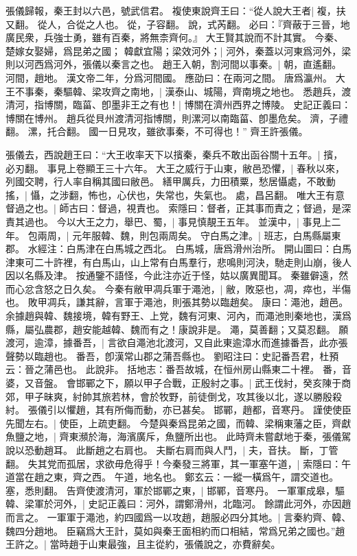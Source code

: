 張儀歸報，秦王封以六邑，號武信君。
複使東說齊王曰：“從人說大王者|{
	複，扶又翻。
	從人，合從之人也。
	從，子容翻。
	說，式芮翻。
}
必曰：『齊蔽于三晉，地廣民衆，兵強士勇，雖有百秦，將無柰齊何。』
大王賢其說而不計其實。
今秦、楚嫁女娶婦，爲昆弟之國；
韓獻宜陽；梁效河外；|{
	河外，秦蓋以河東爲河外，梁則以河西爲河外，張儀以秦言之也。
}
趙王入朝，割河間以事秦。|{
	朝，直遙翻。
	河間，趙地。
	漢文帝二年，分爲河間國。
	應劭曰：在兩河之間。
	唐爲瀛州。
}
大王不事秦，秦驅韓、梁攻齊之南地，|{
	漢泰山、城陽，齊南境之地也。
}
悉趙兵，渡清河，指博關，臨菑、卽墨非王之有也！|{
	博關在濟州西界之博陵。
	史記正義曰：博關在博州。
	趙兵從貝州渡清河指博關，則漯河以南臨菑、卽墨危矣。
	濟，子禮翻。
	漯，托合翻。
}
國一日見攻，雖欲事秦，不可得也！”
齊王許張儀。

張儀去，西說趙王曰：“大王收率天下以擯秦，秦兵不敢出函谷關十五年。|{
	擯，必刃翻。
	事見上卷顯王三十六年。
}
大王之威行于山東，敝邑恐懼，|{
	春秋以來，列國交聘，行人率自稱其國曰敝邑。
}
繕甲厲兵，力田積粟，愁居懾處，不敢動搖，|{
	懾，之涉翻，怖也，心伏也，失常也，失氣也。
	處，昌呂翻。
}
唯大王有意督過之也。|{
	師古曰：督過，視責也。
	索隱曰：督者，正其事而責之；督過，是深責其過也。
}
今以大王之力，舉巴、蜀，|{
	事見慎靚王五年。
}
並漢中，|{
	事見上二年。
}
包兩周，|{
	元年服韓、魏，則包兩周矣。
}
守白馬之津。|{
	班志，白馬縣屬東郡。
	水經注：白馬津在白馬城之西北。
	白馬城，唐爲滑州治所。
	開山圖曰：白馬津東可二十許裡，有白馬山，山上常有白馬羣行，悲鳴則河決，馳走則山崩，後人因以名縣及津。
	按通鑒不語怪，今此注亦近于怪，姑以廣異聞耳。
}
秦雖僻遠，然而心忿含怒之日久矣。
	今秦有敝甲凋兵軍于澠池，|{
	敝，敗惡也，凋，瘁也，半傷也。
	敗甲凋兵，謙其辭，言軍于澠池，則張其勢以臨趙矣。
	康曰：澠池，趙邑。
	余據趙與韓、魏接境，韓有野王、上党，魏有河東、河內，而澠池則秦地也，漢爲縣，屬弘農郡，趙安能越韓、魏而有之！康說非是。
	澠，莫善翻；又莫忍翻。
}
願渡河，逾漳，據番吾，|{
	言欲自澠池北渡河，又自此東逾漳水而進據番吾，此亦張聲勢以臨趙也。
	番吾，卽漢常山郡之蒲吾縣也。
	劉昭注曰：史記番吾君，杜預云：晉之蒲邑也。
	此說非。
	括地志：番吾故城，在恒州房山縣東二十裡。
	番，音婆，又音盤。
}
會邯鄲之下，願以甲子合戰，正殷紂之事。|{
	武王伐紂，癸亥陳于商郊，甲子昧爽，紂帥其旅若林，會於牧野，前徒倒戈，攻其後以北，遂以勝殷殺紂。
	張儀引以懼趙，其有所侮而動，亦已甚矣。
	邯鄲，趙都，音寒丹。
}
謹使使臣先聞左右。|{
	使臣，上疏吏翻。
}
今楚與秦爲昆弟之國，而韓、梁稱東藩之臣，齊獻魚鹽之地，|{
	齊東瀕於海，海濱廣斥，魚鹽所出也。
	此時齊未嘗獻地于秦，張儀駕說以恐動趙耳。
}
此斷趙之右肩也。
	夫斷右肩而與人鬥，|{
	夫，音扶。
	斷，丁管翻。
}
失其党而孤居，求欲毋危得乎！今秦發三將軍，其一軍塞午道，|{
	索隱曰：午道當在趙之東，齊之西。
	午道，地名也。
	鄭玄云：一縱一橫爲午，謂交道也。
	塞，悉則翻。
}
告齊使渡清河，軍於邯鄲之東，|{
	邯鄲，音寒丹。
}
一軍軍成皋，驅韓、梁軍於河外，|{
	史記正義曰：河外，謂鄭滑州，北臨河。
	餘謂此河外，亦因趙而言之。
}
一軍軍于澠池，約四國爲一以攻趙，趙服必四分其地。|{
	言秦約齊、韓、魏四分趙地。
}
臣竊爲大王計，莫如與秦王面相約而口相結，常爲兄弟之國也。”趙王許之。|{
	當時趙于山東最強，且主從約，張儀說之，亦費辭矣。
}

